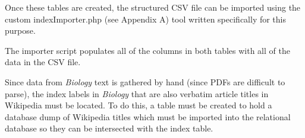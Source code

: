 Once these tables are created, the structured CSV file can be imported using the custom indexImporter.php (see Appendix A) tool written specifically for this purpose.

The importer script populates all of the columns in both tables with all of the data in the CSV file.


Since data from {\it Biology} text is gathered by hand (since PDFs are difficult to parse), the index labels in {\it Biology} that are also verbatim article titles in Wikipedia must be located.
To do this, a table must be created to hold a database dump of Wikipedia titles which must be imported into the relational database so they can be intersected with the index table.


